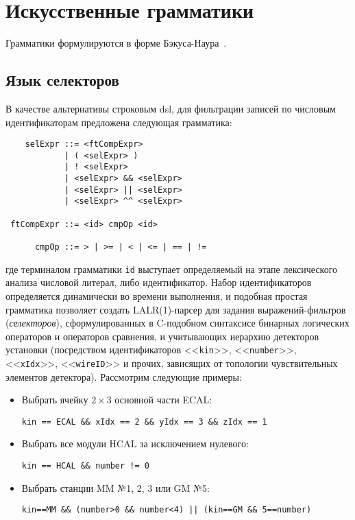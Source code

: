 \chapter{Искусственные грамматики}
\label{appendix:dsl-grammars}

Грамматики формулируются в форме Бэкуса-Наура~\cite{backusNaurAlgol1963revised}.

\section{Язык селекторов}

В качестве альтернативы строковым \acrshort{dsl}, для фильтрации записей
по числовым идентификаторам предложена следующая грамматика:
\begin{verbatim}
    selExpr ::= <ftCompExpr>
            | ( <selExpr> )
            | ! <selExpr>
            | <selExpr> && <selExpr>
            | <selExpr> || <selExpr>
            | <selExpr> ^^ <selExpr>
            
 ftCompExpr ::= <id> cmpOp <id>
 
      cmpOp ::= > | >= | < | <= | == | != 
\end{verbatim}
где терминалом грамматики \texttt{id} выступает определяемый на этапе
лексического анализа числовой литерал, либо идентификатор. Набор
идентификаторов определяется динамически во времени выполнения, и
подобная простая грамматика позволяет создать LALR(1)-парсер для
задания выражений-фильтров (\emph{селекторов}), сформулированных
в C-подобном синтаксисе бинарных логических операторов и операторов
сравнения, и учитывающих иерархию детекторов установки (посредством
идентификаторов <<\texttt{kin}>>, <<\texttt{number}>>,
<<\texttt{xIdx}>>, <<\texttt{wireID}>> и прочих, зависящих от топологии
чувствительных элементов детектора). Рассмотрим следующие примеры:

\begin{itemize}
    \item Выбрать ячейку $2\times3$ основной части
    ECAL:
    
    \texttt{kin == ECAL \&\& xIdx == 2 \&\& yIdx == 3 \&\& zIdx == 1}

    \item Выбрать все модули HCAL за исключением нулевого:

    \texttt{kin == HCAL \&\& number != 0}

    \item Выбрать станции MM №1, 2, 3 или GM №5:

    \texttt{kin==MM \&\& (number>0 \&\& number<4) || (kin==GM \&\& 5==number)}
\end{itemize}


